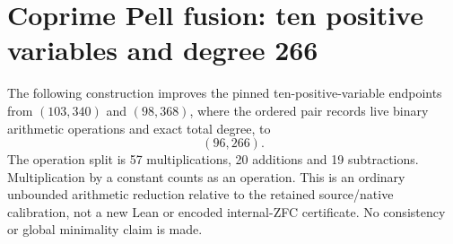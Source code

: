 \section{Coprime Pell fusion: ten positive variables and degree 266}
\label{sec:positive-fusion}

The following construction improves the pinned ten-positive-variable
endpoints from $(103,340)$ and $(98,368)$, where the ordered pair records
live binary arithmetic operations and exact total degree, to
\[
                    \boxed{(96,266)}.
\]
The operation split is 57 multiplications, 20 additions and 19 subtractions.
Multiplication by a constant counts as an operation. This is an ordinary
unbounded arithmetic reduction relative to the retained source/native
calibration, not a new Lean or encoded internal-ZFC certificate. No
consistency or global minimality claim is made.

